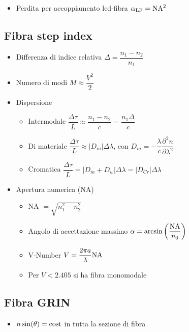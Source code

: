 \documentclass{article}
\begin{document}
\begin{itemize}
  \item Perdita per accoppiamento led-fibra \( \alpha_{\textnormal{LF}} = \textnormal{NA} ^ 2 \)
\end{itemize}
\subsection{Fibra step index}
\begin{itemize}
  \item Differenza di indice relativa \(  \Delta = \dfrac{n_1 - n_2}{n_1} \)
  \item Numero di modi \(  M \approx \dfrac{V^2}{2} \)
  \item Dispersione
        \begin{itemize}
          \item Intermodale \(  \dfrac{\Delta \tau}{L} \approx \dfrac{n_1 - n_2}{c} = \dfrac{n_1 \Delta}{c} \)
          \item Di materiale \(  \dfrac{\Delta \tau}{L} \approx | D_m | \Delta \lambda \), con \( D_m =  -\dfrac{\lambda}{c} \dfrac{\partial ^ 2 n}{\partial \lambda ^ 2} \)
          \item Cromatica \( \dfrac{\Delta \tau}{L} = | D_m + D_w | \Delta \lambda = | D_{Cr} | \Delta \lambda \)
        \end{itemize}
  \item Apertura numerica (NA)
        \begin{itemize}
          \item NA \( \displaystyle = \sqrt{n_1^2 - n_2^2} \)
          \item Angolo di accettazione massimo \( \alpha = \arcsin \left( \dfrac{\textnormal{NA}}{n_0} \right) \)
          \item V-Number \( V = \dfrac{2 \pi a}{\lambda} \textnormal{NA} \)
          \item Per \( V < 2.405 \) si ha fibra monomodale
        \end{itemize}
\end{itemize}

\subsection{Fibra GRIN}
\begin{itemize}
  \item \( n \sin(\theta) = \textnormal{cost} \) in tutta la sezione di fibra
\end{itemize}
\end{document}

